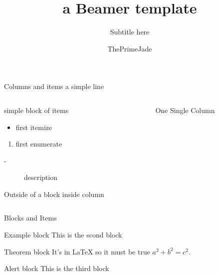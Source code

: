 \documentclass{beamer}
\title[Beamer]{a Beamer template}
\subtitle{Subtitle here}
\author{ThePrimeJade}
\institute{\large \textbf{Bold text}: \\[6pt] Text one}
\date{}
\begin{document}
\begin{frame}
    \maketitle
\end{frame}

\begin{frame}[t]{Columns and items} \vspace{2mm}
a simple line
    \begin{columns}
        \begin{column}[]{.5\textwidth}
            \begin{block}{simple block of items}
                \begin{itemize}
                    \item first itemize
                \end{itemize}
                \begin{enumerate}
                    \item first enumerate
                \end{enumerate}
                \begin{description}
                    \item[-] description
                \end{description}
            \end{block}
            \vspace{2em}
    Outside of a block inside column
        \end{column}

        \begin{column}[]{.5\textwidth}
            One Single Column
        \end{column}
    \end{columns}
\end{frame}
\begin{frame}[t]{Blocks and Items} \vspace{2mm}

    \begin{exampleblock}{Example block}
        This is the scond block
    \end{exampleblock}

    \begin{theorem}{Theorem block}
        It's in \LaTeX{} so it must be true $ a^2 + b^2 = c^2$.
    \end{theorem}

    \begin{alertblock}{Alert block}
        This is the third block
    \end{alertblock}
\end{frame}
\end{document}
